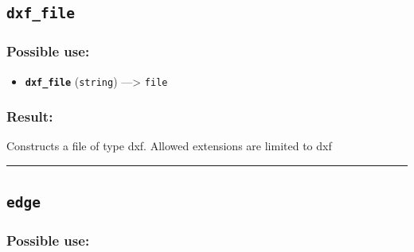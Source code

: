 \documentclass[]{book}
\providecommand{\tightlist}{%
  \setlength{\itemsep}{0pt}\setlength{\parskip}{0pt}}
\theoremstyle{definition}
\theoremstyle{definition}
\theoremstyle{definition}
\theoremstyle{remark}
\begin{document}
\subsection{\texorpdfstring{\texttt{dxf\_file}}{dxf\_file}}\label{dxf_file}

\subsubsection{Possible use:}\label{possible-use-143}

\begin{itemize}
\tightlist
\item
  \textbf{\texttt{dxf\_file}} (\texttt{string}) ---\textgreater{}
  \texttt{file}
\end{itemize}

\subsubsection{Result:}\label{result-139}

Constructs a file of type dxf. Allowed extensions are limited to dxf

\begin{center}\rule{0.5\linewidth}{\linethickness}\end{center}

\subsection{\texorpdfstring{\texttt{edge}}{edge}}\label{edge-1}

\subsubsection{Possible use:}\label{possible-use-144}
\end{document}

